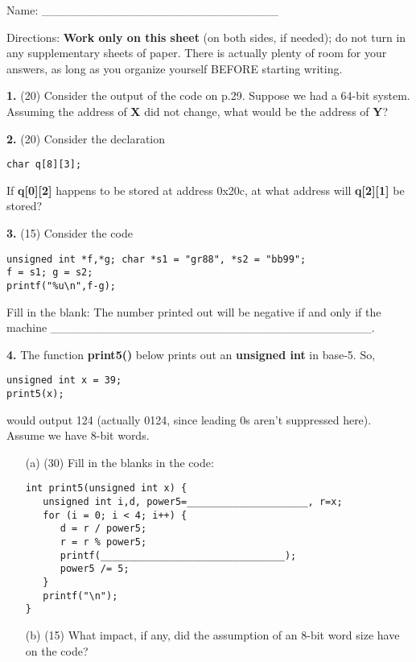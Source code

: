 \documentclass[twocolumn]{article}
\begin{document}
Name: \_\_\_\_\_\_\_\_\_\_\_\_\_\_\_\_\_\_\_\_\_\_\_\_\_\_\_\_

Directions: {\bf Work only on this sheet} (on both sides, if needed); do not
turn in any supplementary sheets of paper. There is actually plenty of room
for your answers, as long as you organize yourself BEFORE starting writing.

{\bf 1.} (20) Consider the output of the code on p.29.  Suppose we had a
64-bit system.  Assuming the address of {\bf X} did not
change, what would be the address of {\bf Y}?

{\bf 2.} (20)  Consider the declaration

\begin{Verbatim}[fontsize=\relsize{-2}]
char q[8][3];
\end{Verbatim}

If {\bf q[0][2]} happens to be stored at address 0x20c, at what address
will {\bf q[2][1]} be stored?

{\bf 3.} (15) Consider the code

\begin{Verbatim}[fontsize=\relsize{-2}]
unsigned int *f,*g; char *s1 = "gr88", *s2 = "bb99";
f = s1; g = s2;
printf("%u\n",f-g);
\end{Verbatim}

Fill in the blank:  The number printed out will be negative if and only
if the machine 
\_\_\_\_\_\_\_\_\_\_\_\_\_\_\_\_\_\_\_\_\_\_\_\_\_\_\_\_\_\_\_\_\_\_\_\_\_\_.

{\bf 4.}  The function {\bf print5()} below prints out an {\bf
unsigned int} in base-5.  So,

\begin{Verbatim}[fontsize=\relsize{-2}]
unsigned int x = 39;
print5(x);
\end{Verbatim}

would output 124  (actually 0124, since leading 0s aren't suppressed
here).  Assume we have 8-bit words.

\begin{itemize}

\item [(a)] (30) Fill in the blanks in the code:

\begin{Verbatim}[fontsize=\relsize{-2}]
int print5(unsigned int x) {
   unsigned int i,d, power5=_____________________, r=x;
   for (i = 0; i < 4; i++) {
      d = r / power5;
      r = r % power5;
      printf(________________________________);
      power5 /= 5;
   }
   printf("\n");
}
\end{Verbatim}

\item [(b)] (15) What impact, if any, did the assumption of an 8-bit word
size have on the code?

\end{itemize}
\end{document}
